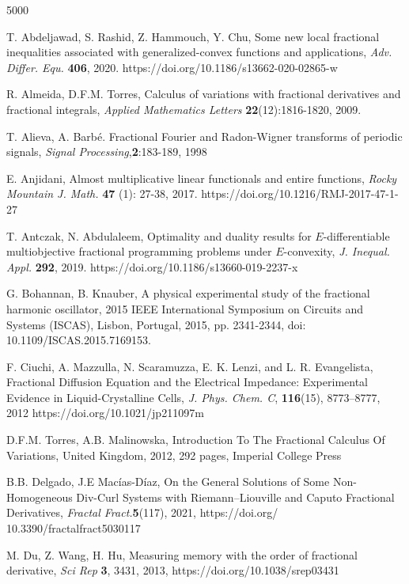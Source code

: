 \documentclass[10pt]{article}
\begin{document}
\fi


\small

\begin{thebibliography}{5000}

 T. Abdeljawad, S. Rashid, Z. Hammouch, Y. Chu, Some new local fractional inequalities associated with generalized-convex functions and applications, {\it Adv. Differ. Equ.} {\bf406}, 2020. https://doi.org/10.1186/s13662-020-02865-w

R. Almeida,  D.F.M. Torres, 
Calculus of variations with fractional derivatives and fractional integrals, {\it Applied Mathematics Letters}
{\bf22}(12):1816-1820,  2009.


 T. Alieva, A. Barb\'e.
Fractional Fourier and Radon-Wigner transforms of periodic signals, {\it Signal Processing},{\bf 2}:183-189, 1998

 E. Anjidani, Almost multiplicative linear functionals and entire functions,  {\it Rocky Mountain J. Math.} {\bf47} (1): 27-38, 2017. https://doi.org/10.1216/RMJ-2017-47-1-27

 T. Antczak, N. Abdulaleem,  Optimality and duality results for $E$-differentiable multiobjective fractional programming problems under $E$-convexity, {\it J. Inequal. Appl.}  {\bf 292}, 2019. https://doi.org/10.1186/s13660-019-2237-x

 G. Bohannan, B. Knauber, A physical experimental study of the fractional harmonic oscillator, 2015 IEEE International Symposium on Circuits and Systems (ISCAS), Lisbon, Portugal, 2015, pp. 2341-2344, doi: 10.1109/ISCAS.2015.7169153.

F. Ciuchi, A. Mazzulla, N. Scaramuzza, E. K. Lenzi, and L. R. Evangelista, Fractional Diffusion Equation and the Electrical Impedance: Experimental Evidence in Liquid-Crystalline Cells,
{\it J. Phys. Chem. C}, {\bf116}(15), 8773–8777, 2012
https://doi.org/10.1021/jp211097m

  D.F.M. Torres, A.B. Malinowska, Introduction To The Fractional Calculus Of Variations, United Kingdom, 2012, 292 pages, Imperial College Press

 B.B. Delgado, J.E Macías-Díaz,
On the General Solutions of Some
Non-Homogeneous Div-Curl
Systems with Riemann–Liouville and
Caputo Fractional Derivatives, {\it Fractal
Fract.}{\bf 5}(117), 2021, https://doi.org/
10.3390/fractalfract5030117

 M. Du, Z. Wang, H. Hu, Measuring memory with the order of fractional derivative, {\it Sci Rep} {\bf3}, 3431, 2013, https://doi.org/10.1038/srep03431




\end{thebibliography}
\end{document}
